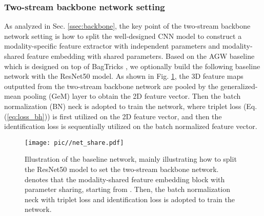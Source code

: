 \documentclass[journal]{IEEEtran}
\begin{document}
\subsubsection{Two-stream backbone network setting}
\label{sssec:banckbone}
As analyzed in Sec. \ref{ssec:backbone}, the key point of the two-stream backbone network setting is how to split the well-designed CNN model to construct a modality-specific feature extractor with independent parameters and modality-shared feature embedding with shared parameters.
Based on the AGW baseline \cite{Ye2020DeepLF} which is designed on top of BagTricks \cite{Luo2019ASB}, we optionally build the following baseline network with the ResNet50 model.
As shown in Fig. \ref{fig:net_share}, the 3D feature maps outputted from the two-stream backbone network are pooled by the generalized-mean pooling (GeM) layer to obtain the 2D feature vector. Then the batch normalization (BN) neck is adopted to train the network, where triplet loss (Eq. (\ref{eq:loss_bh})) is first utilized on the 2D feature vector, and then the identification loss is sequentially utilized on the batch normalized feature vector.

\begin{figure}
\centering
\texttt{[image: pic//net\_share.pdf]}
\caption{Illustration of the baseline network, mainly illustrating how to split the ResNet50 model to set the two-stream backbone network.  denotes that the modality-shared feature embedding block with parameter sharing, starting from  . Then, the batch normalization neck with triplet loss and identification loss is adopted to train the network.}
\label{fig:net_share}
\end{figure}
\end{document}
